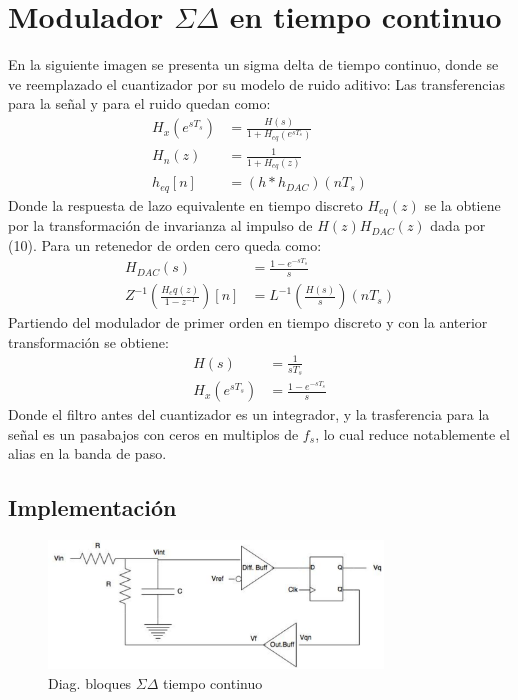 \documentclass[a4paper,conference]{IEEEtran}
\begin{document}
\section{Modulador $\Sigma\Delta$ en tiempo continuo}
En la siguiente imagen se presenta un sigma delta de tiempo continuo, donde se ve reemplazado el cuantizador por su modelo de ruido aditivo:
Las transferencias para la se\~nal y para el ruido quedan como:
\begin{align}
H_x(e^{sT_s}) &= \frac{H(s)}{1+H_{eq}(e^{sT_s})} \\
H_n(z) &= \frac{1}{1+H_{eq}(z)} \\
h_{eq}[n] &= (h\ast h_{DAC})(nT_s)
\end{align}
Donde la respuesta de lazo equivalente en tiempo discreto $H_{eq}(z)$ se la obtiene por la transformaci\'on de invarianza al impulso \cite{DSP:Pro-Man} de $H(z)H_{DAC}(z)$ dada por (10). Para un retenedor de orden cero queda como:
\begin{align}
 H_{DAC}(s)&=\frac{1-e^{-sT_s}}{s}\\
 Z^{-1}(\frac{H_eq(z)}{1-z^{-1}})[n]&=L^{-1}(\frac{H(s)}{s})(nT_s)
\end{align}
Partiendo del modulador de primer orden en tiempo discreto y con la anterior transformaci\'on se obtiene:
\begin{align}
 H(s)&=\frac{1}{sT_s}\\
 H_x(e^{sT_s})&= \frac{1-e^{-sT_s}}{s}
\end{align}
Donde el filtro antes del cuantizador es un integrador, y la trasferencia para la se\~nal es un pasabajos con ceros en multiplos de $f_s$, lo cual reduce notablemente el alias en la banda de paso.
\subsection{Implementaci\'on}

\begin{figure}[!t]
\centering
\includegraphics[width=3.5in]{Sigma-Delta_Tiempo_Continuo}
\caption{Diag. bloques $\Sigma\Delta$ tiempo continuo}
\label{fig_4}
\end{figure}
\end{document}
